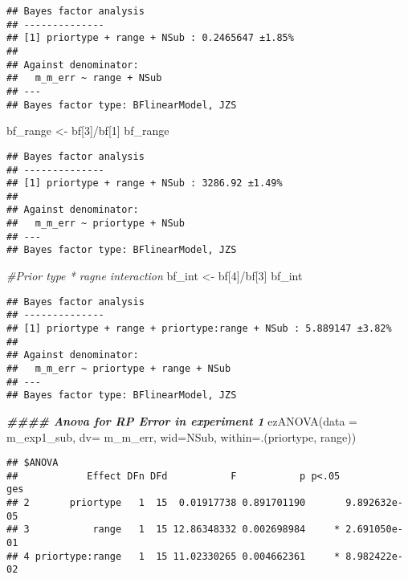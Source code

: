 \documentclass[
]{article}
\newenvironment{Shaded}{\begin{snugshade}}{\end{snugshade}}
\newcommand{\AttributeTok}[1]{\textcolor[rgb]{0.77,0.63,0.00}{#1}}
\newcommand{\CommentTok}[1]{\textcolor[rgb]{0.56,0.35,0.01}{\textit{#1}}}
\newcommand{\DecValTok}[1]{\textcolor[rgb]{0.00,0.00,0.81}{#1}}
\newcommand{\DocumentationTok}[1]{\textcolor[rgb]{0.56,0.35,0.01}{\textbf{\textit{#1}}}}
\newcommand{\FunctionTok}[1]{\textcolor[rgb]{0.00,0.00,0.00}{#1}}
\newcommand{\NormalTok}[1]{#1}
\newcommand{\OtherTok}[1]{\textcolor[rgb]{0.56,0.35,0.01}{#1}}
\newcommand{\SpecialCharTok}[1]{\textcolor[rgb]{0.00,0.00,0.00}{#1}}
\begin{document}
\begin{verbatim}
## Bayes factor analysis
## --------------
## [1] priortype + range + NSub : 0.2465647 ±1.85%
## 
## Against denominator:
##   m_m_err ~ range + NSub 
## ---
## Bayes factor type: BFlinearModel, JZS
\end{verbatim}

\begin{Shaded}
\begin{Highlighting}[]
\NormalTok{bf\_range }\OtherTok{\textless{}{-}}\NormalTok{ bf[}\DecValTok{3}\NormalTok{]}\SpecialCharTok{/}\NormalTok{bf[}\DecValTok{1}\NormalTok{]}
\NormalTok{bf\_range}
\end{Highlighting}
\end{Shaded}

\begin{verbatim}
## Bayes factor analysis
## --------------
## [1] priortype + range + NSub : 3286.92 ±1.49%
## 
## Against denominator:
##   m_m_err ~ priortype + NSub 
## ---
## Bayes factor type: BFlinearModel, JZS
\end{verbatim}

\begin{Shaded}
\begin{Highlighting}[]
\CommentTok{\#Prior type * ragne interaction }
\NormalTok{bf\_int }\OtherTok{\textless{}{-}}\NormalTok{ bf[}\DecValTok{4}\NormalTok{]}\SpecialCharTok{/}\NormalTok{bf[}\DecValTok{3}\NormalTok{] }
\NormalTok{bf\_int}
\end{Highlighting}
\end{Shaded}

\begin{verbatim}
## Bayes factor analysis
## --------------
## [1] priortype + range + priortype:range + NSub : 5.889147 ±3.82%
## 
## Against denominator:
##   m_m_err ~ priortype + range + NSub 
## ---
## Bayes factor type: BFlinearModel, JZS
\end{verbatim}

\begin{Shaded}
\begin{Highlighting}[]
\DocumentationTok{\#\#\#\# Anova for RP Error in experiment 1}
 \FunctionTok{ezANOVA}\NormalTok{(}\AttributeTok{data =}\NormalTok{ m\_exp1\_sub, }\AttributeTok{dv=}\NormalTok{ m\_m\_err, }\AttributeTok{wid=}\NormalTok{NSub, }\AttributeTok{within=}\NormalTok{.(priortype, range))}
\end{Highlighting}
\end{Shaded}

\begin{verbatim}
## $ANOVA
##            Effect DFn DFd           F           p p<.05          ges
## 2       priortype   1  15  0.01917738 0.891701190       9.892632e-05
## 3           range   1  15 12.86348332 0.002698984     * 2.691050e-01
## 4 priortype:range   1  15 11.02330265 0.004662361     * 8.982422e-02
\end{verbatim}
\end{document}
